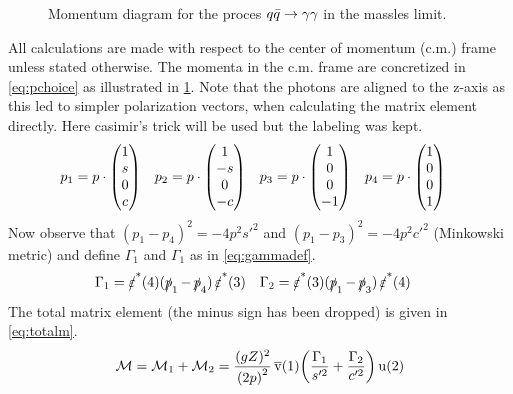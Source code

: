 \begin{wrapfigure}{R}{0.4\textwidth}
\centering
{}
\caption{\label{fig:qqimpulses} Momentum diagram for the proces
  \(q\bar{q}\rightarrow\gamma\gamma\) in the massles limit.}
\end{wrapfigure}
%
All calculations are made with respect to the center of momentum
(c.m.) frame unless stated otherwise. The momenta in the c.m. frame
are concretized in \cref{eq:pchoice} as illustrated in
\cref{fig:qqimpulses}. Note that the photons are aligned to the z-axis
as this led to simpler polarization vectors, when calculating the
matrix element directly. Here casimir's trick will be used but the
labeling was kept.
%
\begin{align}
  \label{eq:pchoice}
  p_1&=p\cdot\mqty(1 \\ s \\ 0 \\ c)
     & p_2&=p\cdot\mqty(1 \\ -s \\ 0 \\ -c)
     & p_3&=p\cdot\mqty(1 \\ 0 \\ 0 \\ -1)
     & p_4&=p\cdot\mqty(1 \\ 0 \\ 0 \\ 1)
\end{align}
%
Now observe that \((p_1-p_4)^2=-4p^2s'^2\) and
\((p_1-p_3)^2=-4p^2c'^2\) (Minkowski metric) and define \(\Gamma_1\)
and \(\Gamma_1\) as in \cref{eq:gammadef}.
%
\begin{align}
  \label{eq:gammadef}
  \Gamma_1 &= \pses(4)(\ps_1 - \ps_4)\pses(3) &
  \Gamma_2 &= \pses(3)(\ps_1 - \ps_3)\pses(4)
\end{align}
%
The total matrix element (the minus sign has been dropped) is given in \cref{eq:totalm}.
\begin{equation}
  \label{eq:totalm}
  \mathcal{M} = \mathcal{M}_1 + \mathcal{M}_2 = \frac{(gZ)^2}{\qty(2p)^2}\operatorname*{\overline{v}}(1)\qty(\frac{\Gamma_1}{s'^2}+\frac{\Gamma_2}{c'^2})\operatorname{u}(2)
\end{equation}
